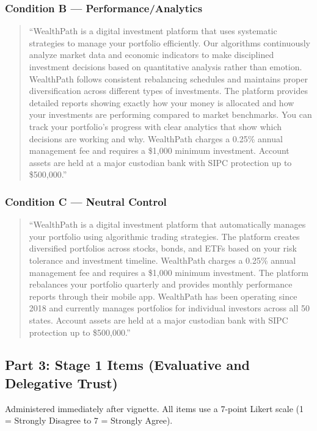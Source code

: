\subsubsection{Condition B --- Performance/Analytics}

\begin{quote}
``WealthPath is a digital investment platform that uses systematic strategies to manage your portfolio efficiently. Our algorithms continuously analyze market data and economic indicators to make disciplined investment decisions based on quantitative analysis rather than emotion. WealthPath follows consistent rebalancing schedules and maintains proper diversification across different types of investments. The platform provides detailed reports showing exactly how your money is allocated and how your investments are performing compared to market benchmarks. You can track your portfolio's progress with clear analytics that show which decisions are working and why. WealthPath charges a 0.25\% annual management fee and requires a \$1,000 minimum investment. Account assets are held at a major custodian bank with SIPC protection up to \$500,000.''
\end{quote}

\subsubsection{Condition C --- Neutral Control}

\begin{quote}
``WealthPath is a digital investment platform that automatically manages your portfolio using algorithmic trading strategies. The platform creates diversified portfolios across stocks, bonds, and ETFs based on your risk tolerance and investment timeline. WealthPath charges a 0.25\% annual management fee and requires a \$1,000 minimum investment. The platform rebalances your portfolio quarterly and provides monthly performance reports through their mobile app. WealthPath has been operating since 2018 and currently manages portfolios for individual investors across all 50 states. Account assets are held at a major custodian bank with SIPC protection up to \$500,000.''
\end{quote}

\subsection{Part 3: Stage 1 Items (Evaluative and Delegative Trust)}

Administered immediately after vignette. All items use a 7-point Likert scale (1 = Strongly Disagree to 7 = Strongly Agree).

